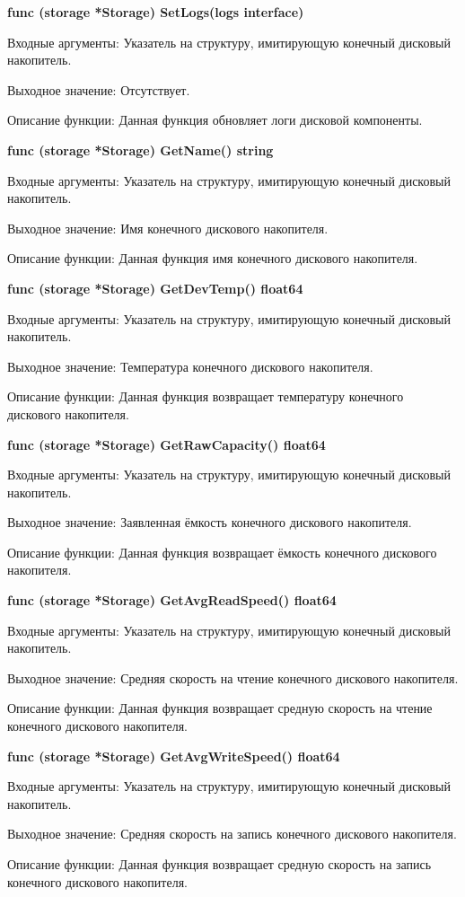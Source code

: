 \textbf{func (storage *Storage) SetLogs(logs interface{})}

Входные аргументы: Указатель на структуру, имитирующую конечный дисковый накопитель.

Выходное значение:  Отсутствует.

Описание функции: Данная функция обновляет логи дисковой компоненты. 

\textbf{func (storage *Storage) GetName() string}

Входные аргументы: Указатель на структуру, имитирующую конечный дисковый накопитель.

Выходное значение: Имя конечного дискового накопителя.

Описание функции: Данная функция имя конечного дискового накопителя.

\textbf{func (storage *Storage) GetDevTemp() float64}

Входные аргументы: Указатель на структуру, имитирующую конечный дисковый накопитель.

Выходное значение: Температура конечного дискового накопителя.

Описание функции: Данная функция возвращает температуру конечного дискового накопителя.

\textbf{func (storage *Storage) GetRawCapacity() float64}

Входные аргументы: Указатель на структуру, имитирующую конечный дисковый накопитель.

Выходное значение: Заявленная ёмкость конечного дискового накопителя.

Описание функции: Данная функция возвращает ёмкость конечного дискового накопителя.

\textbf{func (storage *Storage) GetAvgReadSpeed() float64}

Входные аргументы: Указатель на структуру, имитирующую конечный дисковый накопитель.

Выходное значение: Средняя скорость на чтение конечного дискового накопителя.

Описание функции: Данная функция возвращает средную скорость на чтение конечного дискового накопителя.

\textbf{func (storage *Storage) GetAvgWriteSpeed() float64}

Входные аргументы: Указатель на структуру, имитирующую конечный дисковый накопитель.

Выходное значение: Средняя скорость на запись конечного дискового накопителя.

Описание функции: Данная функция возвращает средную скорость на запись конечного дискового накопителя.
 

